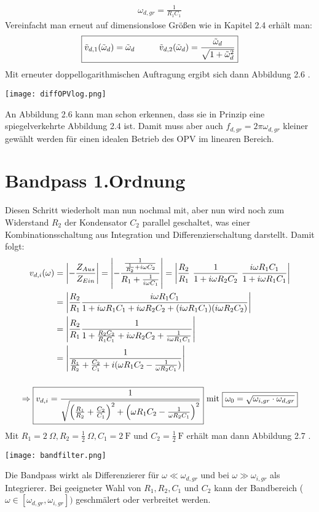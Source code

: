 \begin{gather}
    \boxed{\omega_{d,gr}=\frac{1}{R_1 C_1}}
\end{gather}
Vereinfacht man erneut auf dimensionslose Größen wie in Kapitel 2.4 erhält man:
\begin{gather}
    \boxed{\tilde{v}_{d,1}(\tilde{\omega}_d) = \tilde{\omega}_d \hspace*{1cm} \tilde{v}_{d,2}(\tilde{\omega}_d) =\frac{\tilde{\omega}_d}{\sqrt{1+\tilde{\omega}_d^2}}}
\end{gather}
Mit erneuter doppellogarithmischen Auftragung ergibt sich dann Abbildung 2.6 .
\begin{center}
    \texttt{[image: diffOPVlog.png]}
\end{center}
An Abbildung 2.6 kann man schon erkennen, dass sie in Prinzip eine spiegelverkehrte Abbildung 2.4 ist. Damit muss aber auch $f_{d,gr}=2\pi\omega_{d,gr}$ kleiner gewählt werden für einen idealen Betrieb des OPV im linearen Bereich.
\newpage
\section*{Bandpass 1.Ordnung}
Diesen Schritt wiederholt man nun nochmal mit, aber nun wird noch zum Widerstand $R_2$ der Kondensator $C_2$ parallel geschaltet, was einer Kombinationsschaltung aus Integration und Differenzierschaltung darstellt. Damit folgt:
\begin{gather}
    \begin{aligned}
        v_{d,i}(\omega) &= \abs{-\frac{Z_{Aus}}{Z_{Ein}}} = \abs{-\frac{\frac{1}{\frac{1}{R_2}+ i\omega C_2}}{R_1 + \frac{1}{i\omega C_1}}} = \abs{\frac{R_2}{R_1}~\frac{1}{1+i\omega R_2C_2}~\frac{i\omega R_1 C_1}{1+i\omega R_1C_1}}\\
        &=\abs{\frac{R_2}{R_1}\frac{i\omega R_1C_1}{1 + i\omega R_1C_1 + i\omega R_2C_2 + (i\omega R_1C_1)(i\omega R_2C_2)}}\\
        &=\abs{\frac{R_2}{R_1}\frac{1}{1 + \frac{R_2C_2}{R_1C_1} + i\omega R_2C_2 + \frac{1}{i\omega R_1C_1}}}\\
        &=\abs{\frac{1}{\frac{R_1}{R_2}+\frac{C_2}{C_1}+i(\omega R_1C_2 - \frac{1}{\omega R_2C_1})}}
    \end{aligned}\\[0.5cm]
    \Rightarrow \boxed{v_{d,i}=\frac{1}{\sqrt{\left(\frac{R_1}{R_2}+\frac{C_2}{C_1}\right)^2+\left(\omega R_1C_2 - \frac{1}{\omega R_2C_1}\right)^2}}}~\text{mit}~\boxed{\omega_0 = \sqrt{\omega_{i,gr}\cdot \omega_{d,gr}}}
\end{gather}
Mit $R_1 = 2~\Omega, R_2 = \frac{1}{2}~\Omega, C_1 = 2~\text{F}$ und $C_2 = \frac{1}{2}~\text{F}$ erhält man dann Abbildung 2.7 .
\begin{center}
    \texttt{[image: bandfilter.png]}
\end{center}
Die Bandpass wirkt als Differenzierer für $\omega \ll \omega_{d,gr}$ und bei $\omega \gg \omega_{i,gr}$ als Integrierer. Bei geeigneter Wahl von $R_1, R_2, C_1$ und $C_2$ kann der Bandbereich ($\omega \in [\omega_{d,gr},\omega_{i,gr}])$ geschmälert oder verbreitet werden. 